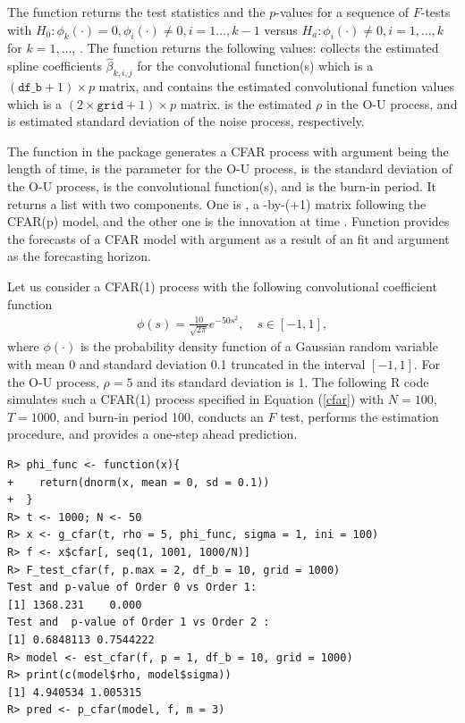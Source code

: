 The function  returns the test statistics and the $p$-values for a sequence of $F$-tests with $H_0: \phi_k(\cdot)=0, \phi_i(\cdot)\neq 0, i=1\ldots, k-1$ versus $H_a: \phi_i(\cdot) \neq 0, i=1,\ldots,k$ for  $k=1,\ldots$, . The function  returns the following values:  collects the estimated spline coefficients $\hat{\beta}_{k,i,j}$ for the convolutional function(s) which is a $(\texttt{df\_b}+1)\times p$ matrix, and  contains the estimated convolutional function values which is a $(2\times \texttt{grid}+1) \times p$ matrix.  is the estimated $\rho$ in the O-U process, and  is estimated standard deviation of the noise process, respectively.


The function  in the  package generates a CFAR process with argument  being the length of time,  is the parameter for the O-U process,  is the standard deviation of the O-U process,  is the convolutional function(s), and  is the burn-in period. It returns a list with two components. One is , a -by-(+1) matrix following the CFAR(p) model, and the other one  is the innovation at time .
Function  provides the forecasts of a CFAR model with argument  as a result of an  fit and argument  as the forecasting horizon.

Let us consider a CFAR(1) process with the following convolutional coefficient function
\begin{align}\label{cfar}
\phi(s)=\frac{10}{\sqrt{2\pi }}e^{-50s^2}, \quad s\in[-1,1],
\end{align}
where $\phi(\cdot)$ is the probability density function of a Gaussian random variable with mean 0 and standard deviation 0.1 truncated in the interval $[-1,1]$. For the O-U process, $\rho=5$ and its standard deviation is 1. The following {R} code simulates such a CFAR(1) process specified in Equation (\ref{cfar}) with $N=100$, $T=1000$, and burn-in period 100, conducts an $F$ test, performs the estimation procedure,
and provides a one-step ahead prediction.

\begin{verbatim}
R> phi_func <- function(x){
+    return(dnorm(x, mean = 0, sd = 0.1))
+  }
R> t <- 1000; N <- 50
R> x <- g_cfar(t, rho = 5, phi_func, sigma = 1, ini = 100)
R> f <- x$cfar[, seq(1, 1001, 1000/N)]
R> F_test_cfar(f, p.max = 2, df_b = 10, grid = 1000)
Test and p-value of Order 0 vs Order 1:  
[1] 1368.231    0.000
Test and  p-value of Order 1 vs Order 2 :  
[1] 0.6848113 0.7544222
R> model <- est_cfar(f, p = 1, df_b = 10, grid = 1000)
R> print(c(model$rho, model$sigma))
[1] 4.940534 1.005315
R> pred <- p_cfar(model, f, m = 3)
\end{verbatim}


